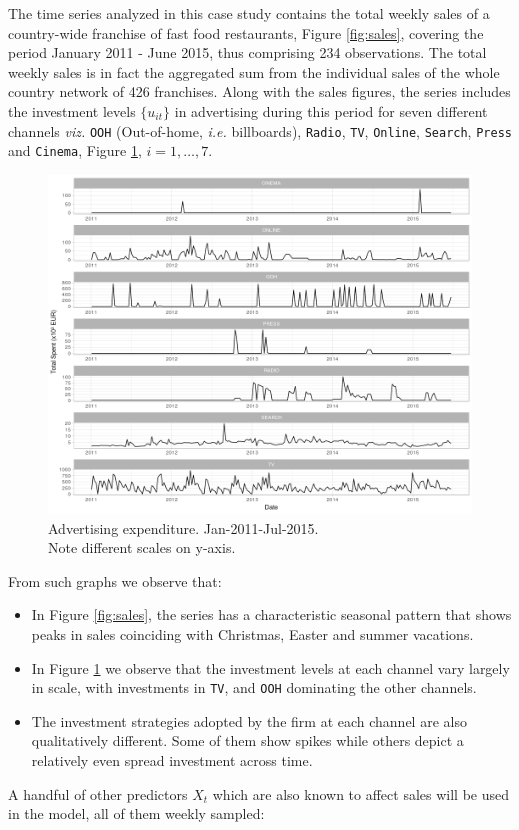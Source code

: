 The time series analyzed in this case study contains the total weekly sales of a country-wide franchise of fast food restaurants, Figure \ref{fig:sales}, covering the period January 2011 - June 2015, thus comprising 234 observations. The total weekly sales is in fact the aggregated sum from the individual sales of the whole country network of 426 franchises. Along with the sales figures, the series includes the investment levels $\{u_{it}\}$  in advertising during this period  for seven different channels \emph{viz.} \texttt{OOH} (Out-of-home, \emph{i.e.} billboards), \texttt{Radio}, \texttt{TV}, \texttt{Online}, \texttt{Search}, \texttt{Press} and \texttt{Cinema}, Figure \ref{fig:canales}, $i=1,\ldots,7$.



\begin{figure}[h]
\centering
\includegraphics[scale=0.5]{figures/02_canales_b.png}
\caption{Advertising expenditure. Jan-2011-Jul-2015. \\ Note  different scales on  y-axis.}\label{fig:canales}
\end{figure}

From such graphs we observe that:
\begin{itemize}
\item In Figure \ref{fig:sales}, the series has a characteristic seasonal pattern that shows peaks in sales coinciding with Christmas, Easter and summer vacations. 
\item In Figure \ref{fig:canales} we observe that the investment levels at each channel vary largely in scale, with investments in \texttt{TV}, and \texttt{OOH} dominating the other channels.
\item The investment strategies adopted by the firm at each channel are also qualitatively different. Some of them show spikes while others depict a relatively even spread investment across time.%
\end{itemize}
A handful of other predictors $X_t$ which are also known to affect sales will be used in the model, all of them weekly sampled:

